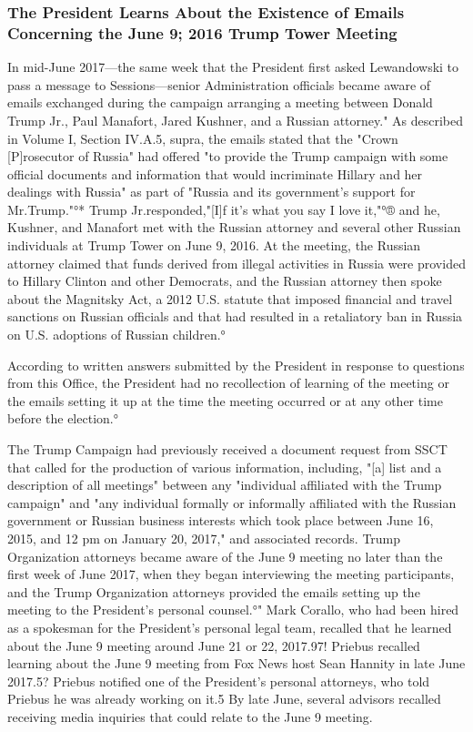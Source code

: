 \subsubsection{The President Learns About the Existence of Emails Concerning the June 9; 2016 Trump Tower Meeting}

In mid-June 2017—the same week that the President first asked Lewandowski to pass a message to Sessions—senior Administration officials became aware of emails exchanged during the campaign arranging a meeting between Donald Trump Jr., Paul Manafort, Jared Kushner, and a Russian attorney."
As described in Volume I, Section IV.A.5, supra, the emails stated that the "Crown [P]rosecutor of Russia" had offered "to provide the Trump campaign with some official documents and information that would incriminate Hillary and her dealings with Russia" as part of "Russia and its government's support for Mr.Trump."°*
Trump Jr.responded,"[I]f it's what you say I love it,"°®
and he, Kushner, and Manafort met with the Russian attorney and several other Russian individuals at Trump Tower on June 9, 2016.%
At the meeting, the Russian attorney claimed that funds derived from illegal activities in Russia were provided to Hillary Clinton and other Democrats, and the Russian attorney then spoke about the Magnitsky Act, a 2012 U.S. statute that imposed financial and travel sanctions on Russian officials and that had resulted in a retaliatory ban in Russia on U.S. adoptions of Russian children.°

According to written answers submitted by the President in response to questions from this Office, the President had no recollection of learning of the meeting or the emails setting it up at the time the meeting occurred or at any other time before the election.°

The Trump Campaign had previously received a document request from SSCT that called for the production of various information, including, "[a] list and a description of all meetings" between any "individual affiliated with the Trump campaign" and "any individual formally or informally affiliated with the Russian government or Russian business interests which took place between June 16, 2015, and 12 pm on January 20, 2017," and associated records.%
Trump Organization attorneys became aware of the June 9 meeting no later than the first week of June 2017, when they began interviewing the meeting participants, and the Trump Organization attorneys provided the emails setting up the meeting to the President's personal counsel.°"
Mark Corallo, who had been hired as a spokesman for the President's personal legal team, recalled that he learned about the June 9 meeting around June 21 or 22, 2017.97!
Priebus recalled learning about the June 9 meeting from Fox News host Sean Hannity in late June 2017.5?
Priebus notified one of the President's personal attorneys, who told Priebus he was already working on it.5
By late June, several advisors recalled receiving media inquiries that could relate to the June 9 meeting. %

